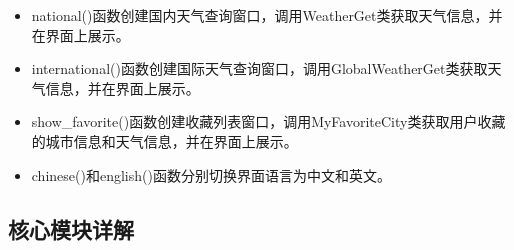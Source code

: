 \documentclass[UTF8]{ctexart}
\begin{document}
\begin{enumerate}[1.]
\begin{itemize}
            \item national()函数创建国内天气查询窗口，调用WeatherGet类获取天气信息，并在界面上展示。
            \item international()函数创建国际天气查询窗口，调用GlobalWeatherGet类获取天气信息，并在界面上展示。
            \item show\_favorite()函数创建收藏列表窗口，调用MyFavoriteCity类获取用户收藏的城市信息和天气信息，并在界面上展示。
            \item chinese()和english()函数分别切换界面语言为中文和英文。
         \end{itemize}
\end{enumerate}

\subsection{核心模块详解}
\end{document}
